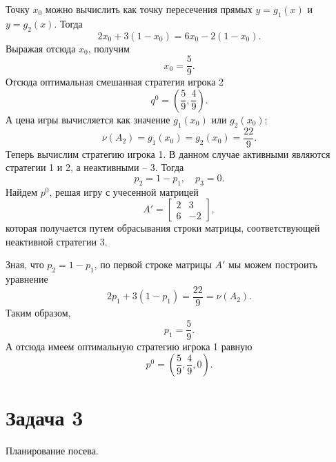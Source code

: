 \documentclass[11pt]{article}
\begin{document}
Точку \(x_0\) можно вычислить как точку пересечения прямых \(y=g_1(x)\)
и \(y=g_2(x)\). Тогда \[2x_0  + 3(1-x_0) = 6x_0 -2(1-x_0).\] Выражая
отсюда \(x_0\), получим \[x_0 = \dfrac59.\] Отсюда оптимальная смешанная
стратегия игрока 2 \[q^0 = \left(\dfrac59, \dfrac49\right).\] А цена
игры вычисляется как значение \(g_1(x_0)\) или \(g_2(x_0)\):
\[\nu(A_2)=g_1(x_0) = g_2(x_0) = \dfrac{22}9.\] Теперь вычислим
стратегию игрока 1. В данном случае активными являются стратегии 1 и 2,
а неактивными -- 3. Тогда \[p_2 = 1-p_1, \quad p_3 = 0.\] Найдем
\(p^0\), решая игру с учесенной матрицей
\[A' = \begin{bmatrix} 2 & 3 \\ 6 & -2\end{bmatrix},\] которая
получается путем обрасывания строки матрицы, соответствующей неактивной
стратегии 3.

Зная, что \(p_2 = 1-p_1\), по первой строке матрицы \(A'\) мы можем
построить уравнение \[2p_1  + 3(1-p_1) = \dfrac{22}9 = \nu(A_2).\] Таким
образом, \[p_1 = \dfrac59.\] А отсюда имеем оптимальную стратегию игрока
1 равную \[p^0 = \left(\dfrac59, \dfrac49, 0\right).
\]

    \section{Задача 3}\label{ux437ux430ux434ux430ux447ux430-3}

    Планирование посева.
\end{document}
